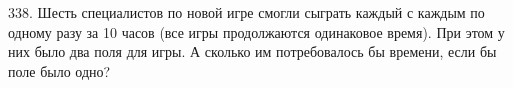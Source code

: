 338. Шесть специалистов по новой игре смогли сыграть каждый с каждым по одному разу за 10 часов (все игры продолжаются одинаковое время). При этом у них было два поля для игры. А сколько им потребовалось бы времени, если бы поле было одно?
\newpage
